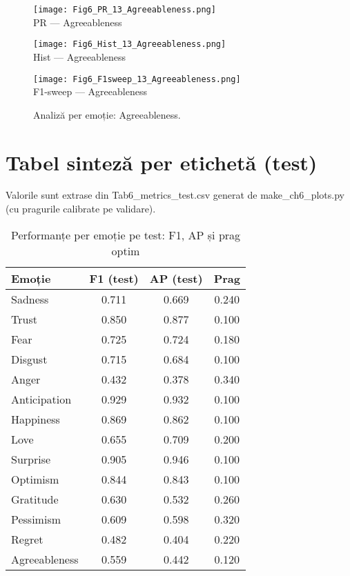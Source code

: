 \begin{figure}[H]
  \centering
  \begin{minipage}[t]{0.32\textwidth}\centering
    \texttt{[image: Fig6\_PR\_13\_Agreeableness.png]}\\[-1mm]
    {\scriptsize PR — Agreeableness}
  \end{minipage}\hfill
  \begin{minipage}[t]{0.32\textwidth}\centering
    \texttt{[image: Fig6\_Hist\_13\_Agreeableness.png]}\\[-1mm]
    {\scriptsize Hist — Agreeableness}
  \end{minipage}\hfill
  \begin{minipage}[t]{0.32\textwidth}\centering
    \texttt{[image: Fig6\_F1sweep\_13\_Agreeableness.png]}\\[-1mm]
    {\scriptsize F1-sweep — Agreeableness}
  \end{minipage}
  \caption{Analiză per emoție: Agreeableness.}
  \label{fig:c6-agreeableness}
\end{figure}

\section{Tabel sinteză per etichetă (test)}
Valorile sunt extrase din Tab6\_metrics\_test.csv generat de make\_ch6\_plots.py (cu pragurile calibrate pe validare).

\begin{table}[tb]\centering
\caption{Performanțe per emoție pe test: F1, AP și prag optim}
\label{tab:c6-per-label}
\begin{tabular}{lccc}
\toprule
Emoție & F1 (test) & AP (test) & Prag \\
\midrule
Sadness & 0.711 & 0.669 & 0.240 \\
Trust & 0.850 & 0.877 & 0.100 \\
Fear & 0.725 & 0.724 & 0.180 \\
Disgust & 0.715 & 0.684 & 0.100 \\
Anger & 0.432 & 0.378 & 0.340 \\
Anticipation & 0.929 & 0.932 & 0.100 \\
Happiness & 0.869 & 0.862 & 0.100 \\
Love & 0.655 & 0.709 & 0.200 \\
Surprise & 0.905 & 0.946 & 0.100 \\
Optimism & 0.844 & 0.843 & 0.100 \\
Gratitude & 0.630 & 0.532 & 0.260 \\
Pessimism & 0.609 & 0.598 & 0.320 \\
Regret & 0.482 & 0.404 & 0.220 \\
Agreeableness & 0.559 & 0.442 & 0.120 \\
\bottomrule
\end{tabular}
\end{table}

